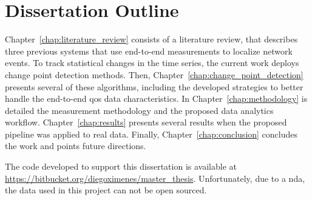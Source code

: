 \section{Dissertation Outline}

Chapter~\ref{chap:literature_review} consists of a literature review, that
describes three previous systems that use
end-to-end measurements to localize network events.
To track statistical changes in the time series, the current
work deploys change point detection methods. Then,
Chapter~\ref{chap:change_point_detection} presents several of these algorithms,
including the developed strategies to better handle the end-to-end \gls*{qos} data
characteristics.
In Chapter~\ref{chap:methodology} is detailed the measurement methodology and
the proposed data analytics workflow.
Chapter~\ref{chap:results} presents several results when the proposed pipeline
was applied to real data.
Finally, Chapter~\ref{chap:conclusion} concludes the work and
points future directions.

The code developed to support this dissertation is available at
\url{https://bitbucket.org/diegoximenes/master_thesis}.
Unfortunately, due to a \gls*{nda},
the data used in this project can not be open sourced.
